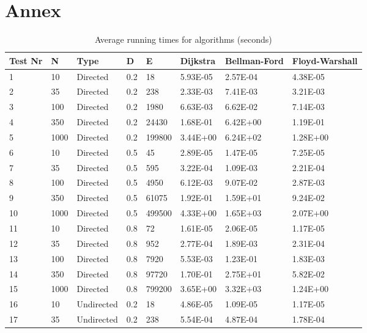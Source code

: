 \documentclass[runningheads]{llncs}
\begin{document}
\section*{Annex}
\begin{table}[!ht]
    \centering
    \caption{Average running times for algorithms (seconds)}
    \begin{tabular}{|l|l|l|l|l|l|l|l|}
    \hline
        \textbf{Test Nr} & \textbf{N} & \textbf{Type} & \textbf{D} & \textbf{E} & \textbf{Dijkstra} & \textbf{Bellman-Ford} & \textbf{Floyd-Warshall} \\ \hline
        1 & 10 & Directed & 0.2 & 18 & 5.93E-05 & 2.57E-04 & 4.38E-05 \\ \hline
        2 & 35 & Directed & 0.2 & 238 & 2.33E-03 & 7.41E-03 & 3.21E-03 \\ \hline
        3 & 100 & Directed & 0.2 & 1980 & 6.63E-03 & 6.62E-02 & 7.14E-03 \\ \hline
        4 & 350 & Directed & 0.2 & 24430 & 1.68E-01 & 6.42E+00 & 1.19E-01 \\ \hline
        5 & 1000 & Directed & 0.2 & 199800 & 3.44E+00 & 6.24E+02 & 1.28E+00 \\ \hline
        6 & 10 & Directed & 0.5 & 45 & 2.89E-05 & 1.47E-05 & 7.25E-05 \\ \hline
        7 & 35 & Directed & 0.5 & 595 & 3.22E-04 & 1.09E-03 & 2.21E-04 \\ \hline
        8 & 100 & Directed & 0.5 & 4950 & 6.12E-03 & 9.07E-02 & 2.87E-03 \\ \hline
        9 & 350 & Directed & 0.5 & 61075 & 1.92E-01 & 1.59E+01 & 9.24E-02 \\ \hline
        10 & 1000 & Directed & 0.5 & 499500 & 4.33E+00 & 1.65E+03 & 2.07E+00 \\ \hline
        11 & 10 & Directed & 0.8 & 72 & 1.61E-05 & 2.06E-05 & 1.17E-05 \\ \hline
        12 & 35 & Directed & 0.8 & 952 & 2.77E-04 & 1.89E-03 & 2.31E-04 \\ \hline
        13 & 100 & Directed & 0.8 & 7920 & 5.53E-03 & 1.23E-01 & 1.83E-03 \\ \hline
        14 & 350 & Directed & 0.8 & 97720 & 1.70E-01 & 2.75E+01 & 5.82E-02 \\ \hline
        15 & 1000 & Directed & 0.8 & 799200 & 3.65E+00 & 3.32E+03 & 1.24E+00 \\ \hline
        16 & 10 & Undirected & 0.2 & 18 & 4.86E-05 & 1.09E-05 & 1.17E-05 \\ \hline
        17 & 35 & Undirected & 0.2 & 238 & 5.54E-04 & 4.87E-04 & 1.78E-04 \\ \hline

\end{tabular}
\end{table}
\end{document}
